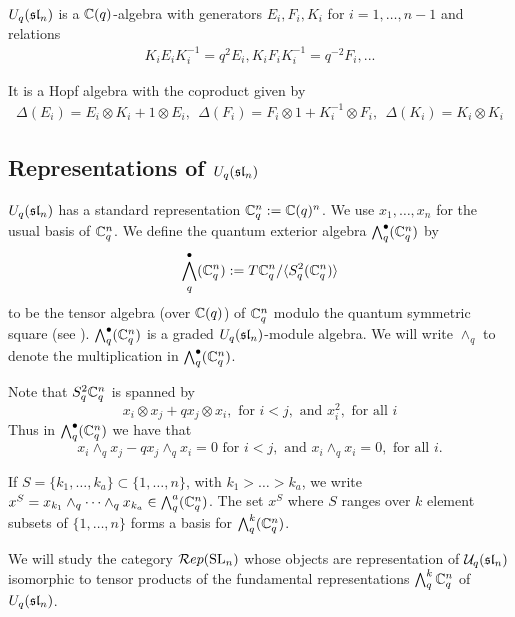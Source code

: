 \documentclass[11pt,leqno]{article}
\begin{document}
$U_q(\sl_n) $ is a $ \bC(q)$-algebra with generators $ E_i, F_i, K_i $ for $ i = 1, \dots, n-1 $ and relations
\begin{align*}
K_i E_i K_i^{-1} = q^2 E_i, K_i F_i K_i^{-1} = q^{-2}F_i, ...
\end{align*}


It is a Hopf algebra with the coproduct given by
\begin{align*}
\Delta(E_i) = E_i \otimes K_i + 1 \otimes E_i, \ \ \Delta(F_i) = F_i \otimes 1 + K_i^{-1} \otimes F_i, \ \ \Delta(K_i) = K_i \otimes K_i 
\end{align*}

\subsection{Representations of $U_q(\sl_n) $}

$U_q(\sl_n) $ has a standard representation $ \bC_q^n := \bC(q)^n $.  We use $ x_1, \dots, x_n $ for the usual basis of $ \bC_q^n $.  We define the quantum exterior algebra $\Alt^\bullet_q(\bC_q^n) $ by
$$
\Alt^\bullet_q(\bC_q^n) := T \bC_q^n / \langle S^2_q ( \bC_q^n) \rangle
$$
to be the tensor algebra (over $\bC(q) $) of $ \bC_q^n $ modulo the quantum symmetric square (see \cite{BZ}).  $ \Alt^\bullet_q(\bC_q^n) $ is a graded $U_q(\sl_n)$-module algebra. We will write $ \wedge_q $ to denote the multiplication in $ \Alt^\bullet_q(\bC_q^n) $.

Note that $S^2_q \bC_q^n $ is spanned by 
$$
x_i \otimes x_j + q x_j \otimes x_i, \text{ for }  i < j , \text{ and } x_i^2, \text{ for all } i 
$$ 
Thus in $ \Alt^\bullet_q(\bC_q^n) $ we have that
$$
x_i \wedge_q x_j - q x_j \wedge_q x_i = 0 \text{ for }  i < j, \text{ and } x_i \wedge_q x_i = 0, \text{ for all }  i . 
$$

If $ S =\{k_1, \dots, k_a\} \subset \{1, \dots, n\} $, with $ k_1 > \dots > k_a $, we write $ x^S = x_{k_1} \wedge_q \cdots \wedge_q x_{k_a} \in \Alt^a_q(\bC_q^n) $. The set $ x^S $ where $ S $ ranges over $ k $ element subsets of $ \{1, \dots, n \} $ forms a basis for $ \Alt^k_q(\bC_q^n) $.

We will study the category $\Rep(\SL_n)$ whose objects are representation of $\Uq(\sl_n) $ isomorphic to tensor products of the fundamental representations $\Alt^k_q \bC_q^n$ of $U_q(\sl_n)$.
\end{document}
